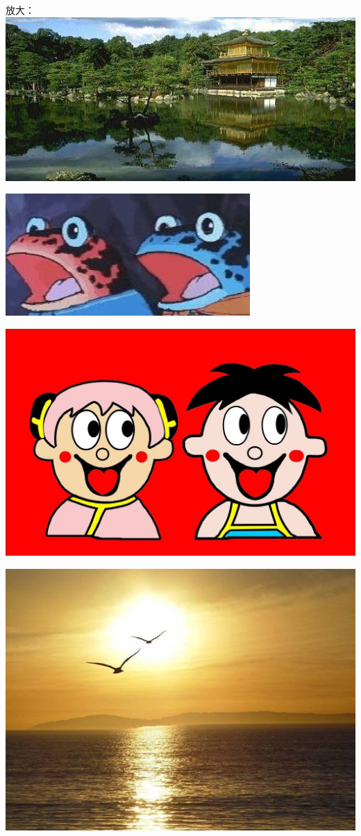 \documentclass[10pt, a4paper]{article}
\begin{document}
    放大：
    \includegraphics[scale = .3]{inputAmplify.jpg}

    \includegraphics[scale = .3]{hhhAmplify.jpg}

    \includegraphics[scale = .3]{666Amplify.jpg}

    \includegraphics[scale = .3]{oriAmplify.jpg}
\end{document}
